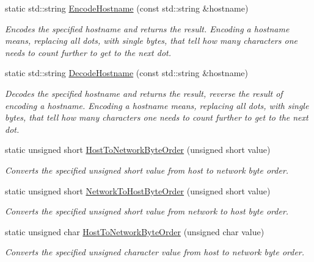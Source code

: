 \begin{DoxyCompactItemize}
\item 
static std\-::string \hyperlink{class_senergy_1_1_dns_1_1_utils_a68f1ebf9810ecb225a4f73c4200778bf}{Encode\-Hostname} (const std\-::string \&hostname)
\begin{DoxyCompactList}\small\item\em Encodes the specified hostname and returns the result. Encoding a hostname means, replacing all dots, with single bytes, that tell how many characters one needs to count further to get to the next dot. \end{DoxyCompactList}\item 
static std\-::string \hyperlink{class_senergy_1_1_dns_1_1_utils_ad621e66ca0463aaa21c9b74b489f09f3}{Decode\-Hostname} (const std\-::string \&hostname)
\begin{DoxyCompactList}\small\item\em Decodes the specified hostname and returns the result, reverse the result of encoding a hostname. Encoding a hostname means, replacing all dots, with single bytes, that tell how many characters one needs to count further to get to the next dot. \end{DoxyCompactList}\item 
static unsigned short \hyperlink{class_senergy_1_1_dns_1_1_utils_a26ed8e47210810c24f8ab5a2588bf276}{Host\-To\-Network\-Byte\-Order} (unsigned short value)
\begin{DoxyCompactList}\small\item\em Converts the specified unsigned short value from host to network byte order. \end{DoxyCompactList}\item 
static unsigned short \hyperlink{class_senergy_1_1_dns_1_1_utils_aa4e117a17add157b5e9bcb5fada4ac49}{Network\-To\-Host\-Byte\-Order} (unsigned short value)
\begin{DoxyCompactList}\small\item\em Converts the specified unsigned short value from network to host byte order. \end{DoxyCompactList}\item 
static unsigned char \hyperlink{class_senergy_1_1_dns_1_1_utils_a952d70b6ddc617c92819eb2ad7e37f0d}{Host\-To\-Network\-Byte\-Order} (unsigned char value)
\begin{DoxyCompactList}\small\item\em Converts the specified unsigned character value from host to network byte order. \end{DoxyCompactList}\item 

\end{DoxyCompactItemize}

